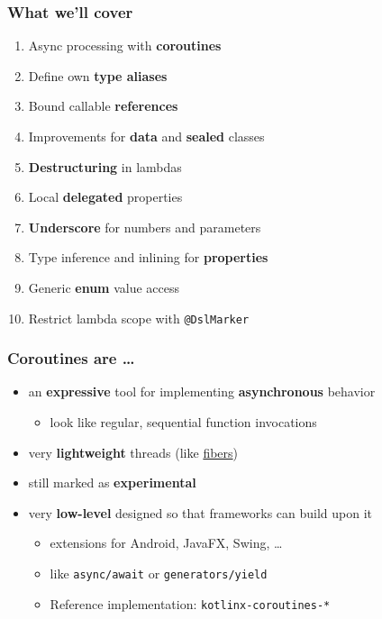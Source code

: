 


\begin{frame}\frametitle{What we'll cover}
  \begin{enumerate}[<+->]
  	\item Async processing with \textbf{coroutines}
	\item Define own \textbf{type aliases}
	\item Bound callable \textbf{references}
	\item Improvements for \textbf{data} and \textbf{sealed} classes
	\item \textbf{Destructuring} in lambdas
	\item Local \textbf{delegated} properties
	\item \textbf{Underscore} for numbers and parameters %
	\item Type inference and inlining for \textbf{properties} %
	\item Generic \textbf{enum} value access
	\item Restrict lambda scope with \texttt{@DslMarker}
  \end{enumerate}
\end{frame}



\begin{frame}[fragile] \frametitle{Coroutines are \ldots}
\begin{itemize}[<+->]
	\item an \textbf{expressive} tool for implementing \textbf{asynchronous} behavior
	\begin{itemize}
		\item look like regular, sequential function invocations
	\end{itemize}
	\item very \textbf{lightweight} threads (like \href{https://en.wikipedia.org/wiki/Fiber_(computer_science)}{fibers}) %
	\item still marked as \textbf{experimental}
	\item very \textbf{low-level} designed so that frameworks can build upon it
	\begin{itemize}
		\item extensions for Android, JavaFX, Swing, \ldots
		\item like \texttt{async/await} or \texttt{generators/yield}
		\item Reference implementation: \texttt{kotlinx-coroutines-*}
	\end{itemize}
\end{itemize}
\end{frame}

